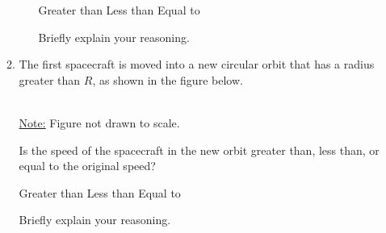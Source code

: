 \documentclass{../../../oss-apphys}
\begin{document}
\begin{enumerate}[leftmargin=15pt]
\begin{enumerate}[leftmargin=15pt,noitemsep]
\begin{enumerate}[leftmargin=15pt,noitemsep]
      \vspace{.1in}
      \underline{\hspace{.3in}}Greater than\hspace{.2in}
      \underline{\hspace{.3in}}Less than\hspace{.2in}
      \underline{\hspace{.3in}}Equal to
      
      \vspace{.1in}Briefly explain your reasoning.
      \vspace{.5in}
    \end{enumerate}
    
  \item The first spacecraft is moved into a new circular orbit that has a
    radius greater than $R$, as shown in the figure below.
    \begin{center}
      \\
      \underline{Note:} Figure not drawn to scale.
    \end{center}
    Is the speed of the spacecraft in the new orbit greater than, less than, or
    equal to the original speed?
    
    \vspace{.1in}
    \underline{\hspace{.3in}}Greater than\hspace{.2in}
    \underline{\hspace{.3in}}Less than\hspace{.2in}
    \underline{\hspace{.3in}}Equal to
      
    \vspace{.1in}Briefly explain your reasoning.   
  \end{enumerate}
  \newpage
  

\end{enumerate}
\end{document}
